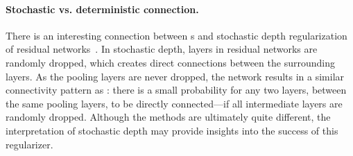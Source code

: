 \vspace{-2ex}
\paragraph{Stochastic vs. deterministic connection.} There is an interesting connection between \methodname{}s and stochastic depth regularization of residual networks~\cite{stochastic}. In stochastic depth, layers in residual networks are randomly dropped, which creates direct connections between the surrounding layers. As the pooling layers are never dropped, the network results in a similar connectivity pattern as \methodnameshort{}: there is a small probability for any two layers, between the same pooling layers, to be directly connected---if all intermediate layers are randomly dropped.  Although the methods are ultimately quite different, the \methodnameshort{} interpretation of stochastic depth may provide insights into the success of this regularizer.



